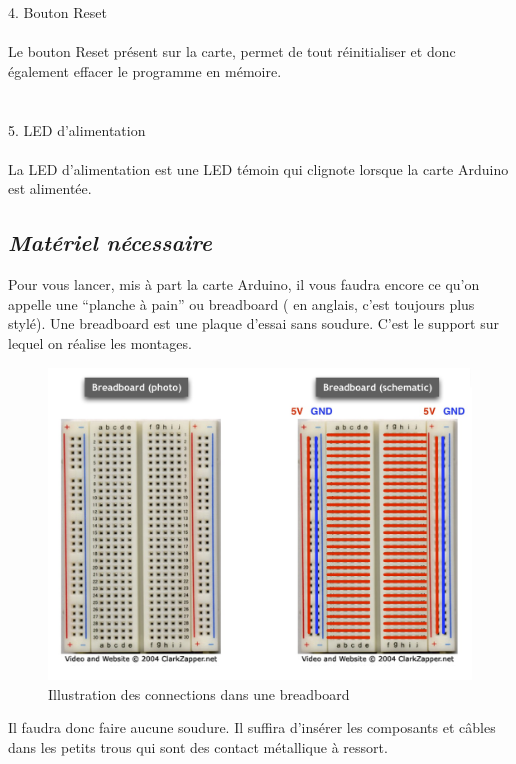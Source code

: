 \documentclass[12pt,a4paper]{article}
\begin{document}
4. Bouton Reset
\\
\\
Le bouton Reset présent sur la carte, permet de tout réinitialiser et donc également effacer le programme en mémoire.
\\
\\
\\
5. LED d'alimentation
\\
\\
La LED d’alimentation est une LED témoin qui clignote lorsque la carte Arduino est alimentée.

\subsection{\textit{\textbf{Matériel nécessaire}}}
Pour vous lancer, mis à part la carte Arduino, il vous faudra encore ce qu’on appelle une “planche à pain” ou breadboard ( en anglais, c’est toujours plus stylé). Une breadboard est une plaque d’essai sans soudure. C’est le support sur lequel on réalise les montages.

\begin{figure}[h!]
    \centering
    \includegraphics[scale=0.49]{breadboard.jpg}
    \caption{Illustration des connections dans une breadboard}
    \label{fig:my_label}
\end{figure}
\bigskip
Il faudra donc faire aucune soudure. Il suffira d'insérer les composants et câbles dans les petits trous qui sont des contact métallique à ressort. 
\end{document}
